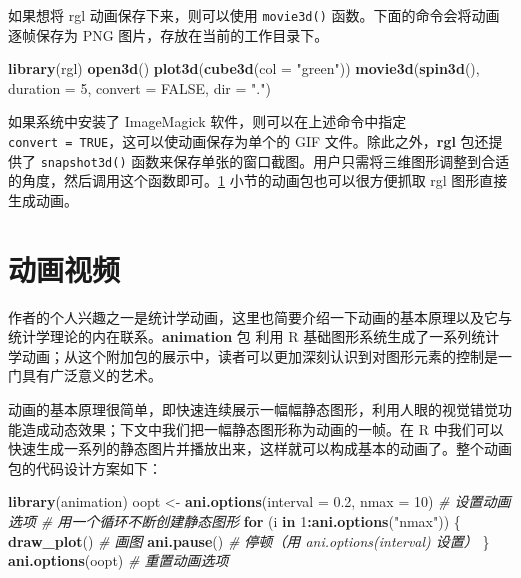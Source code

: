 \documentclass[
  b5paper,
  UTF8,twoside]{book}
\newenvironment{Shaded}{\begin{snugshade}}{\end{snugshade}}
\newcommand{\AttributeTok}[1]{\textcolor[rgb]{0.13,0.29,0.53}{#1}}
\newcommand{\CommentTok}[1]{\textcolor[rgb]{0.56,0.35,0.01}{\textit{#1}}}
\newcommand{\ConstantTok}[1]{\textcolor[rgb]{0.56,0.35,0.01}{#1}}
\newcommand{\ControlFlowTok}[1]{\textcolor[rgb]{0.13,0.29,0.53}{\textbf{#1}}}
\newcommand{\DecValTok}[1]{\textcolor[rgb]{0.00,0.00,0.81}{#1}}
\newcommand{\FloatTok}[1]{\textcolor[rgb]{0.00,0.00,0.81}{#1}}
\newcommand{\FunctionTok}[1]{\textcolor[rgb]{0.13,0.29,0.53}{\textbf{#1}}}
\newcommand{\NormalTok}[1]{#1}
\newcommand{\OtherTok}[1]{\textcolor[rgb]{0.56,0.35,0.01}{#1}}
\newcommand{\SpecialCharTok}[1]{\textcolor[rgb]{0.81,0.36,0.00}{\textbf{#1}}}
\newcommand{\StringTok}[1]{\textcolor[rgb]{0.31,0.60,0.02}{#1}}
\begin{document}
如果想将 rgl 动画保存下来，则可以使用 \texttt{movie3d()} 函数。下面的命令会将动画逐帧保存为 PNG 图片，存放在当前的工作目录下。

\begin{Shaded}
\begin{Highlighting}[]
\FunctionTok{library}\NormalTok{(rgl)}
\FunctionTok{open3d}\NormalTok{()}
\FunctionTok{plot3d}\NormalTok{(}\FunctionTok{cube3d}\NormalTok{(}\AttributeTok{col =} \StringTok{"green"}\NormalTok{))}
\FunctionTok{movie3d}\NormalTok{(}\FunctionTok{spin3d}\NormalTok{(), }\AttributeTok{duration =} \DecValTok{5}\NormalTok{, }\AttributeTok{convert =} \ConstantTok{FALSE}\NormalTok{, }\AttributeTok{dir =} \StringTok{"."}\NormalTok{)}
\end{Highlighting}
\end{Shaded}

如果系统中安装了 ImageMagick 软件，则可以在上述命令中指定 \texttt{convert\ =\ TRUE}，这可以使动画保存为单个的 GIF 文件。除此之外，\textbf{rgl} 包还提供了 \texttt{snapshot3d()} 函数来保存单张的窗口截图。用户只需将三维图形调整到合适的角度，然后调用这个函数即可。\ref{sec:animation} 小节的动画包也可以很方便抓取 rgl 图形直接生成动画。

\section{动画视频}\label{sec:animation}

作者的个人兴趣之一是统计学动画，这里也简要介绍一下动画的基本原理以及它与统计学理论的内在联系。\textbf{animation} 包 \citep{animation} 利用 R 基础图形系统生成了一系列统计学动画；从这个附加包的展示中，读者可以更加深刻认识到对图形元素的控制是一门具有广泛意义的艺术。

动画的基本原理很简单，即快速连续展示一幅幅静态图形，利用人眼的视觉错觉功能造成动态效果；下文中我们把一幅静态图形称为动画的一帧。在 R 中我们可以快速生成一系列的静态图片并播放出来，这样就可以构成基本的动画了。整个动画包的代码设计方案如下：

\begin{Shaded}
\begin{Highlighting}[]
\FunctionTok{library}\NormalTok{(animation)}
\NormalTok{oopt }\OtherTok{\textless{}{-}} \FunctionTok{ani.options}\NormalTok{(}\AttributeTok{interval =} \FloatTok{0.2}\NormalTok{, }\AttributeTok{nmax =} \DecValTok{10}\NormalTok{) }\CommentTok{\# 设置动画选项}
\CommentTok{\# 用一个循环不断创建静态图形}
\ControlFlowTok{for}\NormalTok{ (i }\ControlFlowTok{in} \DecValTok{1}\SpecialCharTok{:}\FunctionTok{ani.options}\NormalTok{(}\StringTok{"nmax"}\NormalTok{)) \{}
  \FunctionTok{draw\_plot}\NormalTok{() }\CommentTok{\# 画图}
  \FunctionTok{ani.pause}\NormalTok{() }\CommentTok{\# 停顿（用 ani.options(\textquotesingle{}interval\textquotesingle{}) 设置）}
\NormalTok{\}}
\FunctionTok{ani.options}\NormalTok{(oopt) }\CommentTok{\# 重置动画选项}
\end{Highlighting}
\end{Shaded}
\end{document}
